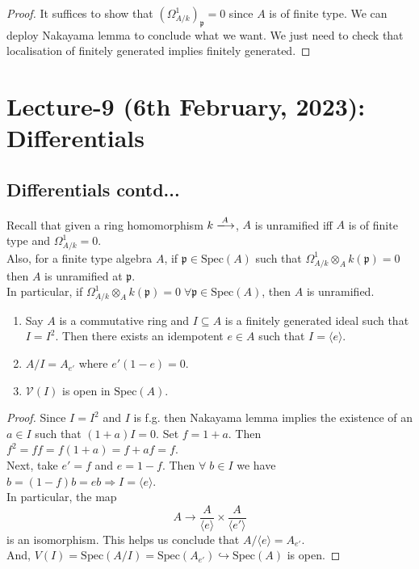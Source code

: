 \documentclass[oneside, 12pt]{scrbook}
\newcommand{\V}{\mathcal{V}}
\newcommand{\spec}{\mathrm{Spec}}
\newcommand{\pr}{\mathfrak{p}}
\theoremstyle{theorem}
\begin{document}
\begin{proof}
It suffices to show that $(\Omega_{A/k}^1)_{\pr} =0$ since $A$ is of finite type. We can deploy Nakayama lemma to conclude what we want. We just need to check that localisation of finitely generated implies finitely generated.
\end{proof}


\chapter{Lecture-9 (6th February, 2023): Differentials}

\section{Differentials contd...}
Recall that given a ring homomorphism $k \xlongrightarrow{A}$, $A$ is unramified iff $A$ is of finite type and $\Omega_{A/k}^{1} =0$. \\

Also, for a finite type algebra $A$, if $\pr \in \spec(A)$ such that $\Omega_{A/k}^{1} \otimes_{A} k (\pr) = 0$ then $A$ is unramified at $\pr$. \\

In particular, if $\Omega_{A/k}^{1} \otimes_{A} k(\pr) = 0 \; \forall \pr \in \spec(A)$, then $A$ is unramified.

\begin{lemma}
\begin{enumerate}
\item Say $A$ is a commutative ring and $I \subseteq A$ is a finitely generated ideal such that $I=I^2$. Then there exists an idempotent $e \in A$ such that $I= \langle e \rangle$.
\item $A/I = A_{e'}$ where $e'(1-e)=0$.
\item $\V(I)$ is open in $\spec(A)$.
\end{enumerate}
\end{lemma}

\begin{proof}
Since $I=I^2$ and $I$ is f.g. then Nakayama lemma implies the existence of an $a\in I$ such that $(1+a)I=0$. Set $f = 1+a$. Then $f^2 = ff = f(1+a)=f + af =f$. \\

Next, take $e' = f$ and $e = 1-f$. Then $\forall \; b \in I$ we have $b=(1-f)b=eb \Rightarrow I =\langle e \rangle$. \\

In particular, the map $$A \rightarrow \frac{A}{\langle e \rangle} \times \frac{A}{\langle e' \rangle}$$ is an isomorphism. This helps us conclude that $A/ \langle e \rangle = A_{e'}$. \\

And, $V(I) = \spec(A/I) = \spec(A_{e'}) \hookrightarrow \spec(A)$ is open. 
\end{proof}
\end{document}
